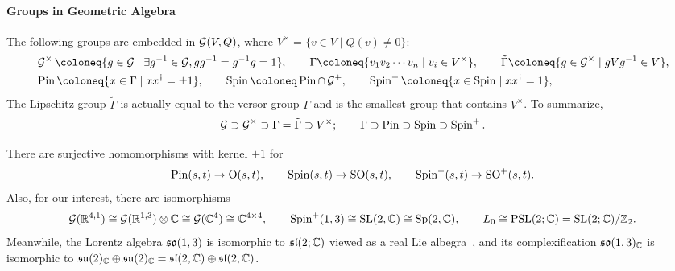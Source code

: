 \documentclass[CheatSheet]{subfiles}
\begin{document}
\paragraph{Groups in Geometric Algebra}
The following groups are embedded in $\operatorname{\mathcal{G}}(V,Q)$,
where $V^\times=\{v\in V\mid Q(v)\neq 0\}$:
\begin{align}
  &\GeoA^\times \deq \{g\in\GeoA\mid \exists g^{-1}\in\GeoA, gg^{-1}=g^{-1}g=1\},
  \qquad \Gamma\deq\{v_1v_2\cdots v_n\mid v_i\in V^\times\},
  \qquad \tilde \Gamma\deq \{g\in\GeoA^\times\mid gVg^{-1}\in V\},
\notag\\
  &\Pin\deq\{x\in \Gamma\mid xx^\dagger = \pm1\},
 \qquad\Spin\deq \Pin\cap\GeoA^+,
 \qquad\Spin^+\deq \{x\in\Spin\mid xx^\dagger=1\},
\end{align}
The Lipschitz group $\tilde\Gamma$ is actually equal to the versor group $\Gamma$ and is the smallest group that contains $V^\times$. To summarize,
\[\operatorname{\mathcal{G}}\supset\operatorname{\mathcal{G}}^\times\supset \Gamma=\tilde\Gamma\supset V^\times;\qquad\Gamma\supset\operatorname{\mathrm{Pin}}\supset\operatorname{\mathrm{Spin}}\supset\operatorname{\mathrm{Spin}}^+.\]

There are surjective homomorphisms with kernel $\pm1$ for
\begin{equation}
  \operatorname{\mathrm{Pin}}(s,t)\to\operatorname{\mathrm O}(s,t),\qquad
  \operatorname{\mathrm{Spin}}(s,t)\to\operatorname{\mathrm SO}(s,t),\qquad
  \operatorname{\mathrm{Spin}}^+(s,t)\to\operatorname{\mathrm SO}^+(s,t).
\end{equation}
Also, for our interest, there are isomorphisms~\cite{RauschdeTraubenberg:2005aa,Yamaguchi:spinor}
\begin{equation}
  \operatorname{\mathcal{G}}({\mathbb{R}}^{4,1})\cong \operatorname{\mathcal{G}}({\mathbb{R}}^{1,3})\otimes {\mathbb{C}} \cong \operatorname{\mathcal{G}}({\mathbb{C}}^4)\cong{\mathbb{C}}^{4\times4},\qquad
  \operatorname{\mathrm{Spin}}^+(1,3)\cong\operatorname{\mathrm SL}(2,{\mathbb{C}})\cong\operatorname{\mathrm Sp}(2,{\mathbb{C}}),\qquad
  L_0\cong\mathop{\mathrm{PSL}}(2;{\mathbb{C}})=\operatorname{\mathrm SL}(2;{\mathbb{C}})/{\mathbb{Z}}_2.
\end{equation}
Meanwhile, the Lorentz algebra $\operatorname{\mathfrak{so}}(1,3)$ is isomorphic to $\operatorname{\mathfrak{sl}}(2;\mathbb C)$ viewed as a real Lie albegra~\cite[\S7.8]{Hall2015},
and its complexification
$\operatorname{\mathfrak{so}}(1,3)_{\mathbb C}$ is isomorphic to $
\operatorname{\mathfrak{su}}(2)_{\mathbb C}\oplus\operatorname{\mathfrak{su}}(2)_{\mathbb C}
=\operatorname{\mathfrak{sl}}(2,\mathbb C)\oplus\operatorname{\mathfrak{sl}}(2,\mathbb C)$.
\end{document}
